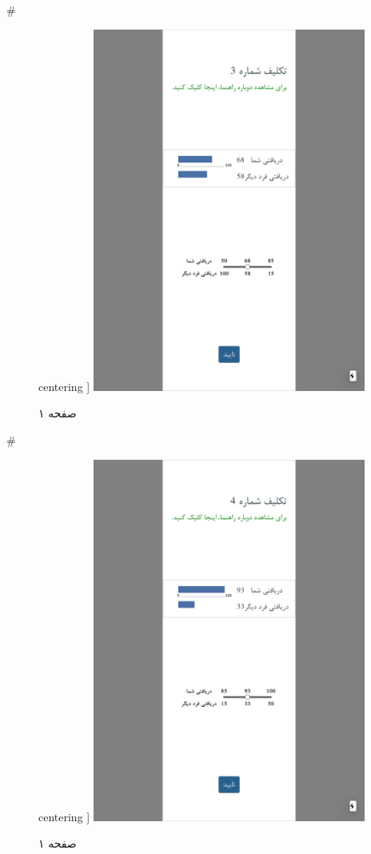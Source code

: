 { 
 # 
\begin{figure}[htpb]
centering ]
\includegraphics[width=0.8\textwidth]{./img/Task44.png/}
\caption{صفحه ۱}
\label{fig:Task1}
\end{figure}
 
 
 # 
\begin{figure}[htpb]
centering ]
\includegraphics[width=0.8\textwidth]{./img/Task45.png/}
\caption{صفحه ۱}
\label{fig:Task1}
\end{figure}
 
}
